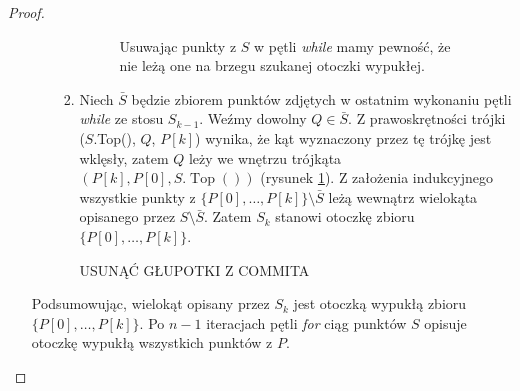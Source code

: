 \begin{theorem}
\begin{proof}
\begin{enumerate}
\begin{itemize}
\begin{enumerate}
\begin{minipage}{0.47\linewidth}
\begin{figure}[H]
							\caption{\small Usuwając punkty z $S$ w pętli \textit{while} mamy pewność, że nie leżą one na brzegu szukanej otoczki wypukłej.}
							\label{fig:graham:usuwanie}
						\end{figure}
					\end{minipage}				

					\item Niech $\bar{S}$ będzie zbiorem punktów zdjętych w ostatnim wykonaniu pętli \textit{while} ze stosu $S_{k-1}$.
					Weźmy dowolny $Q \in \bar{S}$. Z prawoskrętności trójki ($S$.Top(), $Q$, $P[k]$) wynika, że kąt wyznaczony przez tę trójkę jest wklęsły, zatem $Q$ leży we wnętrzu trójkąta $(P[k], P[0], S.\operatorname{Top}())$ (rysunek \ref{fig:graham:usuwanie}). Z założenia indukcyjnego wszystkie punkty z $\{P[0], \dots, P[k]\} \setminus \bar{S}$ leżą wewnątrz wielokąta opisanego przez $S \setminus \bar{S}$. Zatem $S_k$ stanowi otoczkę zbioru $\{P[0], \dots, P[k]\}$.
					
				USUNĄĆ GŁUPOTKI Z COMMITA
				\end{enumerate}				
			\end{itemize}
			Podsumowując, wielokąt opisany przez $S_k$ jest otoczką wypukłą zbioru $\{P[0], \dots, P[k]\}$. Po $n-1$ iteracjach pętli \textit{for} ciąg punktów $S$ opisuje otoczkę wypukłą wszystkich punktów z $P$. \qedhere
		\end{enumerate}
	\end{proof}
\end{theorem}

